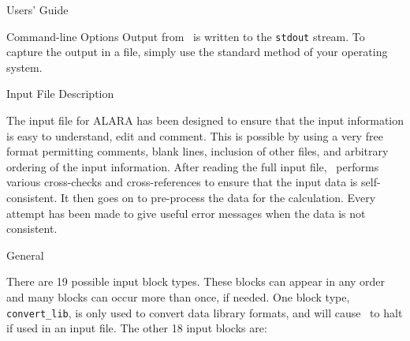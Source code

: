 \begin{chapter}{Users' Guide\label{app:user.guide}}
\begin{section}{Command-line Options}
    Output from \ALARA\ is written to the \texttt{stdout} stream.  To
    capture the output in a file, simply use the standard method of
    your operating system.
    
  \end{section}
  
  
  \begin{section}{Input File Description\label{app:user.input}}
    
    The input file for ALARA has been designed to ensure that the
    input information is easy to understand, edit and comment.  This
    is possible by using a very free format permitting comments, blank
    lines, inclusion of other files, and arbitrary ordering of the
    input information.  After reading the full input file, \ALARA\ 
    performs various cross-checks and cross-references to ensure that
    the input data is self-consistent.  It then goes on to pre-process
    the data for the calculation.  Every attempt has been made to give
    useful error messages when the data is not consistent.

    \begin{subsection}{General}
    
      There are 19 possible input block types.  These blocks can
      appear in any order and many blocks can occur more than once, if
      needed.  One block type, \texttt{convert\_lib}, is only used to
      convert data library formats, and will cause \ALARA\ to halt if
      used in an input file.  The other 18 input blocks are:


\end{subsection}
\end{section}
\end{chapter}
